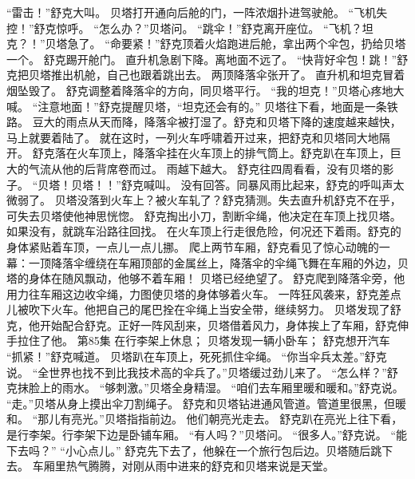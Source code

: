 \documentclass[a4paper,12pt,UTF8,twoside]{ctexbook}
\begin{document}
        “雷击！”舒克大叫。 
        贝塔打开通向后舱的门，一阵浓烟扑进驾驶舱。 
        “飞机失控！”舒克惊呼。 
        “怎么办？”贝塔问。 
        “跳伞！”舒克离开座位。 
        “飞机？坦克？！''贝塔急了。 
        “命要紧！”舒克顶着火焰跑进后舱，拿出两个伞包，扔给贝塔一个。 
        舒克踢开舱门。 
        直升机急剧下降。离地面不远了。 
        “快背好伞包！跳！”舒克把贝塔推出机舱，自己也跟着跳出去。 
        两顶降落伞张开了。 
        直升机和坦克冒着烟坠毁了。 
        舒克调整着降落伞的方向，同贝塔平行。 
        “我的坦克！”贝塔心疼地大喊。 
        “注意地面！”舒克提醒贝塔，“坦克还会有的。” 
        贝塔往下看，地面是一条铁路。 
        豆大的雨点从天而降，降落伞被打湿了。舒克和贝塔下降的速度越来越快，马上就要着陆了。 
        就在这时，一列火车呼啸着开过来，把舒克和贝塔同大地隔开。 
        舒克落在火车顶上，降落伞挂在火车顶上的排气筒上。舒克趴在车顶上，巨大的气流从他的后背席卷而过。 
        雨越下越大。 
        舒克往四周看看，没有贝塔的影子。 
        “贝塔！贝塔！！”舒克喊叫。 
        没有回答。同暴风雨比起来，舒克的呼叫声太微弱了。 
        贝塔没落到火车上？被火车轧了？舒克猜测。失去直升机舒克不在乎，可失去贝塔使他神思恍惚。 
        舒克掏出小刀，割断伞绳，他决定在车顶上找贝塔。如果没有，就跳车沿路往回找。 
        在火车顶上行走很危险，何况还下着雨。舒克的身体紧贴着车顶，一点儿一点儿挪。 
        爬上两节车厢，舒克看见了惊心动魄的一幕：一顶降落伞缠绕在车厢顶部的金属丝上，降落伞的伞绳飞舞在车厢的外边，贝塔的身体在随风飘动，他够不着车厢！ 
        贝塔已经绝望了。 
        舒克爬到降落伞旁，他用力往车厢这边收伞绳，力图使贝塔的身体够着火车。 
        一阵狂风袭来，舒克差点儿被吹下火车。他把自己的尾巴拴在伞绳上当安全带，继续努力。 
        贝塔发现了舒克，他开始配合舒克。正好一阵风刮来，贝塔借着风力，身体挨上了车厢，舒克伸手拉住了他。   第85集 
        在行李架上休息； 
        贝塔发现一辆小卧车； 
        舒克想开汽车   
        “抓紧！”舒克喊道。 
        贝塔趴在车顶上，死死抓住伞绳。 
        “你当伞兵太差。”舒克说。 
        “全世界也找不到比我技术高的伞兵了。”贝塔缓过劲儿来了。 
        “怎么样？”舒克抹脸上的雨水。 
        “够刺激。”贝塔全身精湿。 
        “咱们去车厢里暖和暖和。”舒克说。 
        “走。”贝塔从身上摸出伞刀割绳子。 
        舒克和贝塔钻进通风管道。管道里很黑，但暖和。 
        “那儿有亮光。”贝塔指指前边。 
        他们朝亮光走去。 
        舒克趴在亮光上往下看，是行李架。行李架下边是卧铺车厢。 
        “有人吗？”贝塔问。 
        “很多人。”舒克说。 
        “能下去吗？” 
        “小心点儿。” 
        舒克先下去了，他躲在一个旅行包后边。贝塔随后跳下去。 
        车厢里热气腾腾，对刚从雨中进来的舒克和贝塔来说是天堂。 
\end{document}
